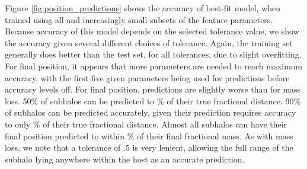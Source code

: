 \documentclass[fleqn,usenatbib]{mnras}
\begin{document}
Figure \ref{fig:position_predictions} shows the accuracy of best-fit model, when trained using all and increasingly small subsets of the feature parameters. Because accuracy of this model depends on the selected tolerance value, we show the accuracy given several different choices of tolerance. Again, the training set generally does better than the test set, for all tolerances, due to slight  overfitting. For final position, it appears that more parameters are needed to reach maximum accuracy, with the first five given parameters being used for predictions before accuracy levels off. For final position, predictions are slightly worse than for mass loss. 50\% of subhalos can be predicted to \% of their true fractional distance. 90\% of subhalos can be predicted accurately, given their prediction requires accuracy to only \% of their true fractional distance. Almost all subhalos can have their final position predicted to within \% of their final fractional mass. As with mass loss, we note that a tolerance of .5 is very lenient, allowing the full range of the subhalo lying anywhere within the host as an accurate prediction.
\end{document}
